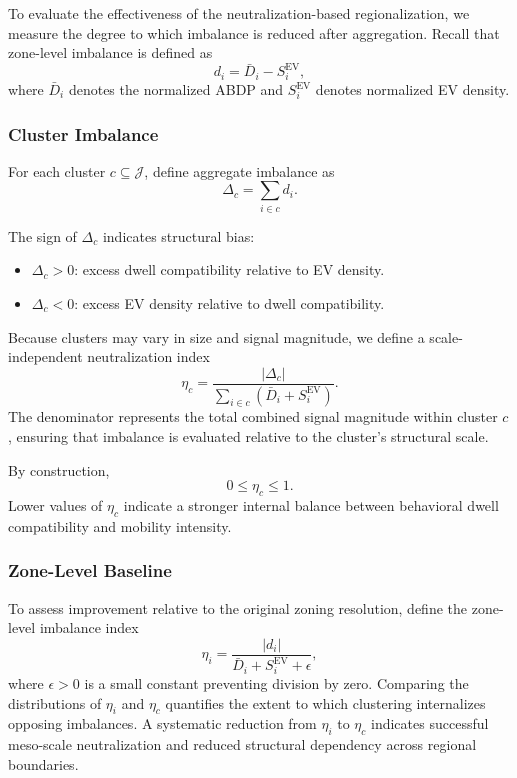 \documentclass[conference]{IEEEtran}
\begin{document}
To evaluate the effectiveness of the neutralization-based regionalization,
we measure the degree to which imbalance is reduced after aggregation.
Recall that zone-level imbalance is defined as
\begin{equation}
d_i = \bar{D}_i - S_i^{\mathrm{EV}},
\end{equation}
where $\bar{D}_i$ denotes the normalized ABDP and $S_i^{\mathrm{EV}}$ denotes normalized EV density.

\subsubsection*{Cluster Imbalance}

For each cluster $c \subseteq \mathcal{J}$, define aggregate imbalance as
\begin{equation}
\Delta_c = \sum_{i\in c} d_i.
\end{equation}

The sign of $\Delta_c$ indicates structural bias:

\begin{itemize}
\item $\Delta_c > 0$: excess dwell compatibility relative to EV density.
\item $\Delta_c < 0$: excess EV density relative to dwell compatibility.
\end{itemize}
Because clusters may vary in size and signal magnitude, we define a
scale-independent neutralization index
\begin{equation}
\eta_c =
\frac{|\Delta_c|}
{\sum_{i\in c} \left(\bar{D}_i + S_i^{\mathrm{EV}}\right)}.
\label{eq:eta_c}
\end{equation}
The denominator represents the total combined signal magnitude within
cluster $c$, ensuring that imbalance is evaluated relative to the
cluster's structural scale.

By construction,
\[
0 \le \eta_c \le 1.
\]
Lower values of $\eta_c$ indicate a stronger internal balance between
behavioral dwell compatibility and mobility intensity.

\subsubsection*{Zone-Level Baseline}

To assess improvement relative to the original zoning resolution,
define the zone-level imbalance index
\begin{equation}
\eta_i =
\frac{|d_i|}
{\bar{D}_i + S_i^{\mathrm{EV}} + \epsilon},
\end{equation}
where $\epsilon>0$ is a small constant preventing division by zero.
Comparing the distributions of $\eta_i$ and $\eta_c$ quantifies the
extent to which clustering internalizes opposing imbalances.
A systematic reduction from $\eta_i$ to $\eta_c$ indicates successful
meso-scale neutralization and reduced structural dependency across
regional boundaries.
\end{document}
